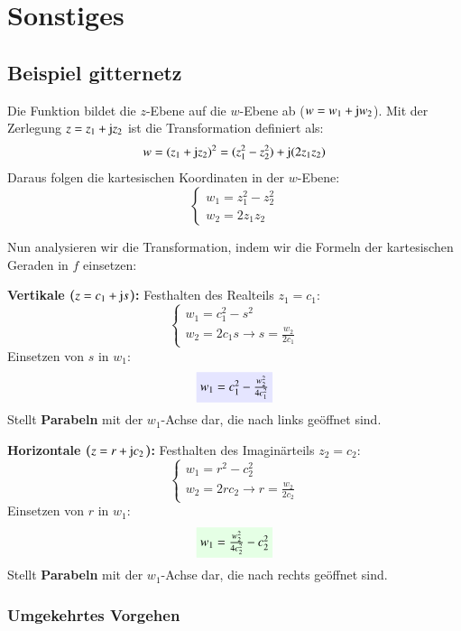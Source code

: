 \section{Sonstiges}
\subsection{Beispiel gitternetz}\label{chap:bsp_gitternetz}

Die Funktion bildet die $z$-Ebene auf die $w$-Ebene ab ($w = w_1 + \mathop{} \! \mathrm{j} w_2$).
Mit der Zerlegung $z = z_1 + \mathop{} \! \mathrm{j} z_2$ ist die Transformation definiert als:
\[ w = (z_1 + \mathop{} \! \mathrm{j} z_2)^2 = (z_1^2 - z_2^2) + \mathop{} \! \mathrm{j}(2 z_1 z_2) \]
Daraus folgen die kartesischen Koordinaten in der $w$-Ebene:
\[
\begin{cases}
    w_1 = z_1^2 - z_2^2 \\
    w_2 = 2 z_1 z_2
\end{cases}
\]

Nun analysieren wir die Transformation, indem wir die Formeln der kartesischen Geraden in $f$ einsetzen:

\begin{minipage}[t]{0.48\linewidth}
    \textbf{Vertikale ($z = c_1 + \mathop{} \! \mathrm{j} s$):}
    Festhalten des Realteils $z_1 = c_1$:
    \[ \begin{cases} w_1 = c_1^2 - s^2 \\ w_2 = 2c_1s \rightarrow s = \frac{w_2}{2c_1} \end{cases} \]
    Einsetzen von $s$ in $w_1$:
    \[ \colorbox{blue!10}{$w_1 = c_1^2 - \frac{w_2^2}{4c_1^2}$} \]
    Stellt \textbf{Parabeln} mit der $w_1$-Achse dar, die nach links geöffnet sind.
\end{minipage}
\hfill
\begin{minipage}[t]{0.48\linewidth}
    \textbf{Horizontale ($z = r + \mathop{} \! \mathrm{j} c_2$):}
    Festhalten des Imaginärteils $z_2 = c_2$:
    \[ \begin{cases} w_1 = r^2 - c_2^2 \\ w_2 = 2rc_2 \rightarrow r = \frac{w_2}{2c_2} \end{cases} \]
    Einsetzen von $r$ in $w_1$:
    \[ \colorbox{green!10}{$w_1 = \frac{w_2^2}{4c_2^2} - c_2^2$} \]
    Stellt \textbf{Parabeln} mit der $w_1$-Achse dar, die nach rechts geöffnet sind.
\end{minipage}

\vspace{1.5em}

\subsubsection{Umgekehrtes Vorgehen}
